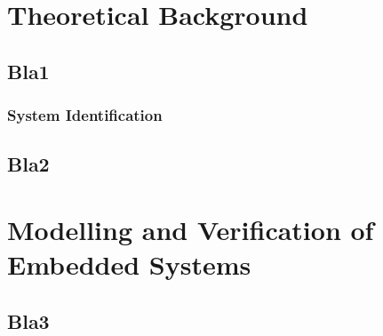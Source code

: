 

\chapter{Theoretical Background}

\section{Bla1}
\label{sec:bla1}
\lipsum[1] 

\subsection{System Identification}
\label{subsec:system_identification}
\lipsum[1] 

\section{Bla2}
\label{sec:bla2}
\lipsum[1] 

\chapter{Modelling and Verification of Embedded Systems}

\section{Bla3}
\label{sec:bla3}
\lipsum[1] 
